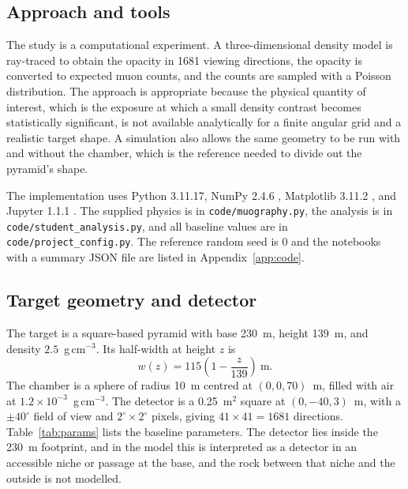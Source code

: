 \documentclass{article}
\begin{document}
\subsection{Approach and tools}

The study is a computational experiment. A three-dimensional density model is
ray-traced to obtain the opacity in 1681 viewing directions, the opacity is
converted to expected muon counts, and the counts are sampled with a Poisson
distribution. The approach is appropriate because the physical quantity of
interest, which is the exposure at which a small density contrast becomes statistically
significant, is not available analytically for a finite angular grid and a
realistic target shape. A simulation also allows the same geometry to be run
with and without the chamber, which is the reference needed to divide out the
pyramid's shape.

\begin{sloppypar}
The implementation uses Python 3.11.17, NumPy 2.4.6 \cite{harris2020numpy},
Matplotlib 3.11.2 \cite{hunter2007matplotlib}, and Jupyter 1.1.1
\cite{kluyver2016jupyter}. The supplied physics is in
\texttt{code/muography.py}, the analysis is in
\texttt{code/student\_analysis.py}, and all baseline values are in
\texttt{code/project\_config.py}. The reference random seed is 0 and the notebooks
with a summary JSON file are listed in Appendix~\ref{app:code}.
\end{sloppypar}

\subsection{Target geometry and detector}

The target is a square-based pyramid with base 230~m, height 139~m, and
density $2.5$~g\,cm$^{-3}$. Its half-width at height $z$ is
\begin{equation}
w(z)=115\left(1-\frac{z}{139}\right)~\mathrm{m}.
\label{eq:width}
\end{equation}
The chamber is a sphere of radius 10~m centred at $(0,0,70)$~m, filled with air
at $1.2\times10^{-3}$~g\,cm$^{-3}$. The detector is a 0.25~m$^2$ square at
$(0,-40,3)$~m, with a $\pm40^\circ$ field of view and $2^\circ\times2^\circ$
pixels, giving $41\times41=1681$ directions. Table~\ref{tab:params} lists the
baseline parameters. The detector lies inside the 230~m footprint, and in the model
this is interpreted as a detector in an accessible niche or passage at the base,
and the rock between that niche and the outside is not modelled.
\end{document}

